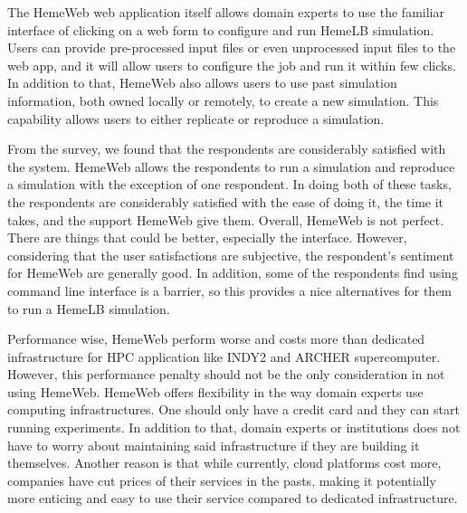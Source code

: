 The HemeWeb web application itself allows domain experts to use the familiar interface of clicking on a web form to configure and run HemeLB simulation. Users can provide pre-processed input files or even unprocessed input files to the web app, and it will allow users to configure the job and run it within few clicks. In addition to that, HemeWeb also allows users to use past simulation information, both owned locally or remotely, to create a new simulation. This capability allows users to either replicate or reproduce a simulation.

From the survey, we found  that the respondents are considerably satisfied with the system. HemeWeb allows the respondents to run a simulation and reproduce a simulation with the exception of one respondent. In doing both of these tasks, the respondents are considerably satisfied with the ease of doing it, the time it takes, and the support HemeWeb give them. Overall, HemeWeb is not perfect. There are things that could be better, especially the interface. However, considering that the user satisfactions are subjective, the respondent's sentiment for HemeWeb are generally good. In addition, some of the respondents find using command line interface is a barrier, so this provides a nice alternatives for them to run a HemeLB simulation.

Performance wise, HemeWeb perform worse and costs more than dedicated infrastructure for HPC application like INDY2 and ARCHER supercomputer. However, this performance penalty should not be the only consideration in not using HemeWeb. HemeWeb offers flexibility in the way domain experts use computing infrastructures. One should only have a credit card and they can start running experiments. In addition to that, domain experts or institutions does not have to worry about maintaining said infrastructure if they are building it themselves. Another reason is that while currently, cloud platforms cost more, companies have cut prices of their services in the pasts\citep{AWSPr74:online, Annou90:online, Googl18:online}, making it potentially more enticing and easy to use their service compared to dedicated infrastructure.



